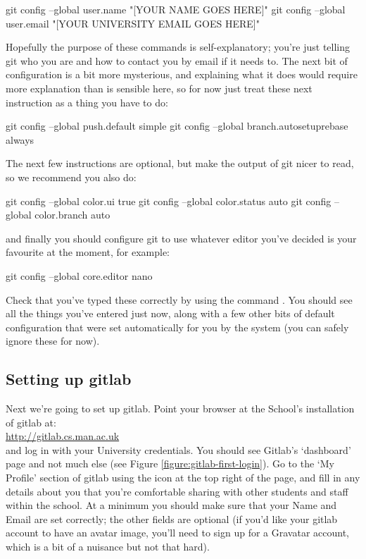 \begin{ttoutenv}
git config --global user.name "[YOUR NAME GOES HERE]"
git config --global user.email "[YOUR UNIVERSITY EMAIL GOES HERE]" 
\end{ttoutenv}

Hopefully the purpose of these commands is self-explanatory; you're just telling git who you are and how to contact you by email if it needs to. The next bit of configuration is a bit more mysterious, and explaining what it does would require more explanation than is sensible here, so for now just treat these next instruction as a thing you have to do:

\begin{ttoutenv}
git config --global push.default simple
git config --global branch.autosetuprebase always 
\end{ttoutenv}

The next few instructions are optional, but make the output of git nicer to read, so we recommend you also do:

\begin{ttoutenv}
git config --global color.ui true
git config --global color.status auto
git config --global color.branch auto 
\end{ttoutenv}

and finally you should configure git to use whatever editor you've decided is your favourite at the moment, for example:

\begin{ttoutenv}
git config --global core.editor nano 
\end{ttoutenv}

Check that you've typed these correctly by using the command . You should see all the things you've entered just now, along with a few other bits of default configuration that were set automatically for you by the system (you can safely ignore these for now).


\subsection{Setting up gitlab}

Next we're going to set up gitlab. Point your browser at the School's installation of gitlab at:
\\
\url{http://gitlab.cs.man.ac.uk}
\\
and log in with your University credentials. You should see Gitlab's `dashboard' page and not much else (see Figure \ref{figure:gitlab-first-login}). Go to the `My Profile' section of gitlab using the icon at the top right of the page, and fill in any details about you that you're comfortable sharing with other students and staff within the school. At a minimum you should make sure that your Name and Email are set correctly; the other fields are optional (if you'd like your gitlab account to have an avatar image, you'll need to sign up for a Gravatar account, which is a bit of a nuisance but not that hard). 

